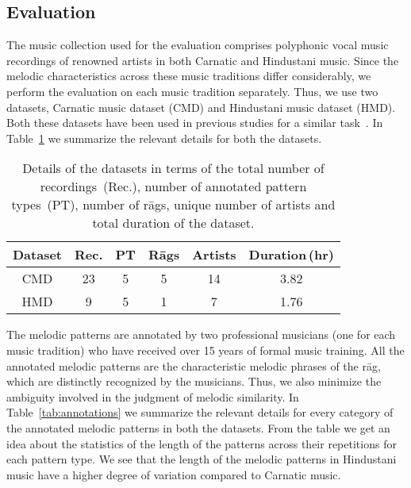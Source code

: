 \subsection{Evaluation}

The music collection used for the evaluation comprises polyphonic vocal music recordings of renowned artists in both Carnatic and Hindustani music. Since the melodic characteristics across these music traditions differ considerably, we perform the evaluation on each music tradition separately. Thus, we use two datasets, Carnatic music dataset (CMD) and Hindustani music dataset (HMD). Both these datasets have been used in previous studies for a similar task~\cite{Ishwar2013, Ross2012b, Rao2014}. In Table~\ref{tab:datasetDetails} we summarize the relevant details for both the datasets. 

\begin{table} 
	\centering
	\begin{tabular}{ c | c c c c c}
		\hline\hline
		Dataset   	& 	Rec. 	&	PT		&	R\={a}gs	&	Artists		&	Duration\,(hr)\\	
		\hline
		CMD   	& 	23 	&	5		&	5 	&	14		&	3.82\\	
		
		HMD   	& 	9 	&	5		&	1	&	7		&	1.76\\	
		\hline\hline
		
	\end{tabular}
	\caption{Details of the datasets in terms of the total number of recordings~(Rec.), number of annotated pattern types~(PT), number of r\={a}gs, unique number of artists and total duration of the dataset.}
	\label{tab:datasetDetails}
\end{table}


The melodic patterns are annotated by two professional musicians (one for each music tradition) who have received over 15 years of formal music training. All the annotated melodic patterns are the characteristic melodic phrases of the r\={a}g, which are distinctly recognized by the musicians. Thus, we also minimize the ambiguity involved in the judgment of melodic similarity. In Table~\ref{tab:annotations} we summarize the relevant details for every category of the annotated melodic patterns in both the datasets. From the table we get an idea about the statistics of the length of the patterns across their repetitions for each pattern type. We see that the length of the melodic patterns in Hindustani music have a higher degree of variation compared to Carnatic music.

